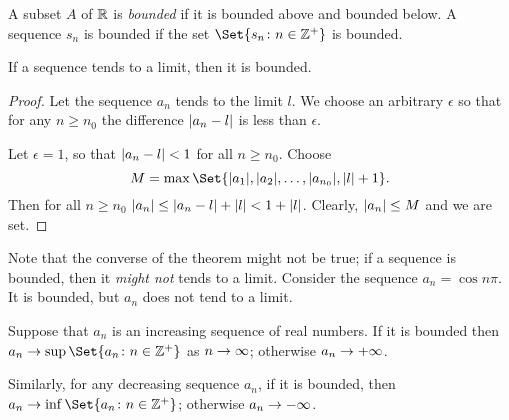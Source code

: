 \documentclass[main.tex]{subfiles}
\begin{document}
	\begin{definition}
		A subset $A$ of $\mathbb R$ is \textit{bounded} if it is bounded above and bounded below. A sequence $s_n$ is bounded if the set $\Set{s_n \colon n \in \ZZ^+}$ is bounded.
	\end{definition}
	\begin{theorem}
		If a sequence tends to a limit, then it is bounded.
	\end{theorem}
	\begin{proof}
		Let the sequence $a_n$ tends to the limit $l$. We choose an arbitrary $\epsilon$ so that for any $n \geq n_0$ the difference $\lvert a_n - l\rvert$ is less than $\epsilon$. 
		
		Let $\epsilon = 1$, so that $\lvert a_n - l\rvert < 1$ for all $n \geq n_0$. Choose
		\begin{equation*}
		M = \max\Set{\abs {a_1} , \abs {a_2}, \ldots, \abs {a_{n_0}}, \abs{l} + 1}.
		\end{equation*}
		Then for all $n \geq n_0$ $\lvert a_{n}\rvert \leq \lvert a_{n} - l\rvert + \lvert l\rvert < 1 + \lvert l\rvert$. Clearly, $\lvert a_n\rvert \leq M$ and we are set.
	\end{proof}
	Note that the converse of the theorem might not be true; if a sequence is bounded, then it \textit{might not} tends to a limit. Consider the sequence $a_n = \cos n\pi$. It is bounded, but $a_n$ does not tend to a limit.
	\begin{theorem}
		Suppose that $a_n$ is an increasing sequence of real numbers. If it is bounded then $a_n \ra \sup\Set{a_n \colon n \in \ZZ^+}$ as $n \rightarrow \infty$; otherwise $a_n \rightarrow +\infty$.
		
		Similarly, for any decreasing sequence $a_n$, if it is bounded, then $a_n \ra {\inf\Set{a_n \colon n \in \ZZ^+}} $; otherwise $a_n \rightarrow -\infty$.
	\end{theorem}
	
\end{document}
